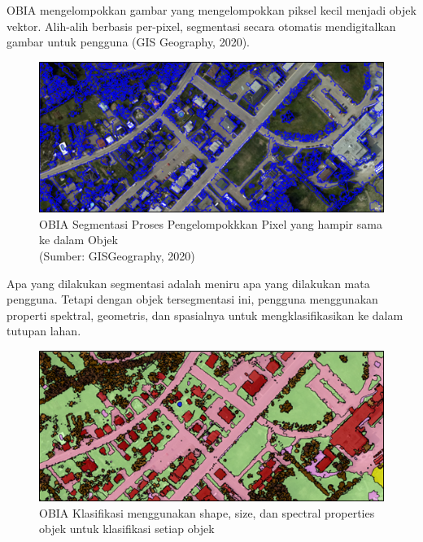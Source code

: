 OBIA mengelompokkan gambar yang mengelompokkan piksel kecil menjadi objek vektor. Alih-alih berbasis per-pixel, segmentasi secara otomatis mendigitalkan gambar untuk pengguna (GIS Geography, 2020).

\begin{figure}[H]
	\vspace{-0.1cm}
	\begin{center}
		\includegraphics[width=1\columnwidth]{bab2/Gambar/Picture44.png}
	\end{center}
	\vspace{-0.2cm}
	\captionsetup{justification=centering}
	\caption{OBIA Segmentasi Proses Pengelompokkkan Pixel yang hampir sama ke dalam Objek\\(Sumber: GISGeography, 2020)}\label{img:OBIA-Segmentasi-Proses}
\end{figure}

Apa yang dilakukan segmentasi adalah meniru apa yang dilakukan mata pengguna. Tetapi dengan objek tersegmentasi ini, pengguna menggunakan properti spektral, geometris, dan spasialnya untuk mengklasifikasikan ke dalam tutupan lahan.

\begin{figure}[H]
	\vspace{-0.1cm}
	\begin{center}
		\includegraphics[width=1\columnwidth]{bab2/Gambar/Picture45.png}
	\end{center}
	\vspace{-0.2cm}
	\captionsetup{justification=centering}
	\caption{OBIA Klasifikasi menggunakan shape, size, dan spectral properties objek untuk klasifikasi setiap objek}\label{img:OBIA-Klasifikasi}
\end{figure}

